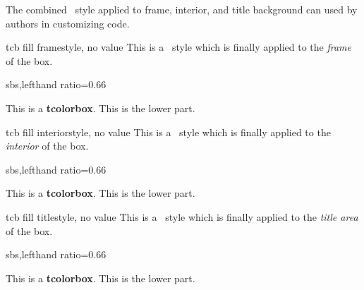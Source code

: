 \clearpage

The combined \tikzname\ style applied to frame, interior, and title
background can used by authors in customizing code.

\begin{docTikzKey}{tcb fill frame}{}{style, no value}
This is a \tikzname\ style which is finally applied to the \emph{frame}
of the box.

\begin{dispExample*}{sbs,lefthand ratio=0.66}

\begin{tcolorbox}[title=My title]
This is a \textbf{tcolorbox}.
\tcblower
This is the lower part.
\end{tcolorbox}
\end{dispExample*}
\end{docTikzKey}


\begin{docTikzKey}{tcb fill interior}{}{style, no value}
This is a \tikzname\ style which is finally applied to the \emph{interior}
of the box.

\begin{dispExample*}{sbs,lefthand ratio=0.66}

\begin{tcolorbox}[title=My title]
This is a \textbf{tcolorbox}.
\tcblower
This is the lower part.
\end{tcolorbox}
\end{dispExample*}
\end{docTikzKey}


\begin{docTikzKey}{tcb fill title}{}{style, no value}
This is a \tikzname\ style which is finally applied to the \emph{title area}
of the box.

\begin{dispExample*}{sbs,lefthand ratio=0.66}

\begin{tcolorbox}[title=My title]
This is a \textbf{tcolorbox}.
\tcblower
This is the lower part.
\end{tcolorbox}
\end{dispExample*}
\end{docTikzKey}


